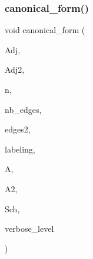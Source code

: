 \subsubsection{\texorpdfstring{canonical\+\_\+form()}{canonical\_form()}}
{\footnotesize\ttfamily void canonical\+\_\+form (\begin{DoxyParamCaption}\item[{\mbox{\hyperlink{galois_8h_a09fddde158a3a20bd2dcadb609de11dc}{I\+NT}} $\ast$}]{Adj,  }\item[{\mbox{\hyperlink{galois_8h_a09fddde158a3a20bd2dcadb609de11dc}{I\+NT}} $\ast$}]{Adj2,  }\item[{\mbox{\hyperlink{galois_8h_a09fddde158a3a20bd2dcadb609de11dc}{I\+NT}}}]{n,  }\item[{\mbox{\hyperlink{galois_8h_a09fddde158a3a20bd2dcadb609de11dc}{I\+NT}}}]{nb\+\_\+edges,  }\item[{\mbox{\hyperlink{galois_8h_a09fddde158a3a20bd2dcadb609de11dc}{I\+NT}} $\ast$}]{edges2,  }\item[{\mbox{\hyperlink{galois_8h_a09fddde158a3a20bd2dcadb609de11dc}{I\+NT}} $\ast$}]{labeling,  }\item[{\mbox{\hyperlink{classaction}{action}} $\ast$\&}]{A,  }\item[{\mbox{\hyperlink{classaction}{action}} $\ast$\&}]{A2,  }\item[{\mbox{\hyperlink{classschreier}{schreier}} $\ast$\&}]{Sch,  }\item[{\mbox{\hyperlink{galois_8h_a09fddde158a3a20bd2dcadb609de11dc}{I\+NT}}}]{verbose\+\_\+level }\end{DoxyParamCaption})}

\mbox{\label{_a_p_p_s_2_c_o_m_b_i_n_a_t_o_r_i_c_s_2nauty_8_c_a7fdbfdd350aa2be773e04a496e2efe31}} 
